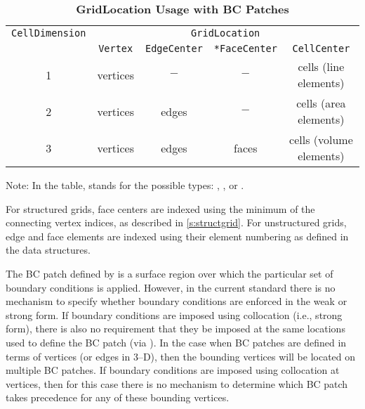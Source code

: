 \begin{table}[htbp]
\centering
\caption[GridLocation Usage with BC Patches]{\textbf{GridLocation Usage with BC Patches}}
\label{t:gridlocationusage3}
\begin{tabular}{||c|c|c|c|c||}
 \hline
\texttt{CellDimension} & \multicolumn{4}{c||}{\texttt{GridLocation}} \\
& \texttt{Vertex} & \texttt{EdgeCenter} & \texttt{*FaceCenter} & \texttt{CellCenter} \\
 \hline
1 & vertices & $-$ & $-$     & cells (line elements) \\
2 & vertices & edges & $-$   & cells (area elements) \\
3 & vertices & edges & faces & cells (volume elements) \\
 \hline
\end{tabular}
\end{table}

Note: In the table,  stands for the possible types: ,
,  or .

For structured grids, face centers are indexed using the minimum of the
connecting vertex indices, as described in \autoref{s:structgrid}.  For
unstructured grids, edge and face elements are indexed using their element
numbering as defined in the  data structures.

The BC patch defined by  is a surface region over which
the particular set of boundary conditions is applied.  However, in the current
standard there is no mechanism to specify whether boundary conditions are
enforced in the weak or strong form.  If boundary conditions are imposed using
collocation (i.e., strong form), there is also no requirement that they be
imposed at the same locations used to define the BC patch (via
).  In the case when BC patches are defined in terms of
vertices (or edges in 3--D), then the bounding vertices will be located on
multiple BC patches.  If boundary conditions are imposed using collocation at
vertices, then for this case there is no mechanism to determine which BC patch
takes precedence for any of these bounding vertices.

